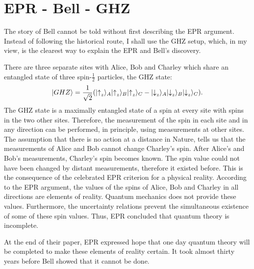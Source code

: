 \documentclass[12pt]{article}
\begin{document}
\section{EPR - Bell - GHZ }\label{E-B-G}

The story of Bell cannot be told without first describing the EPR argument. Instead of following the historical route,   I shall use the GHZ setup, which, in my view, is the clearest way to explain the EPR and Bell's discovery.

There are three separate sites with Alice, Bob and Charley which share an entangled state of three spin-$\frac{1}{2}$ particles, the GHZ state:
\begin{equation}
\label{GHZ}
|GHZ\rangle = {1\over \sqrt
  2}{\Large (}|{\uparrow}_z\rangle_A|{\uparrow}_z\rangle_B|{\uparrow}_z\rangle_C -
|{\downarrow}_z\rangle_A|{\downarrow}_z\rangle_B|{\downarrow}_z\rangle_C{\Large
)} .
\end{equation}
The GHZ state is a maximally entangled state of a spin at every site with spins in the two other sites. Therefore, the measurement of the spin in each site and in any direction can be performed, in principle, using measurements at other sites. The assumption that there is no action at a distance in Nature, tells us that the measurements of Alice and Bob cannot change Charley's spin. After Alice's and Bob's measurements,  Charley's spin becomes known. The spin value could not have been changed by distant measurements, therefore it existed before. This is the consequence of the celebrated EPR criterion for a physical reality. According to the EPR argument, the values of the spins of Alice, Bob and Charley in all directions  are elements of reality. Quantum mechanics does not provide these values. Furthermore, the uncertainty relations prevent the simultaneous existence of some of these spin values. Thus, EPR concluded that quantum theory is incomplete.

 At the end of their paper, EPR expressed hope that one day quantum theory will be completed to make these elements of reality certain. It took almost thirty years before Bell showed that it cannot be done.
\end{document}

